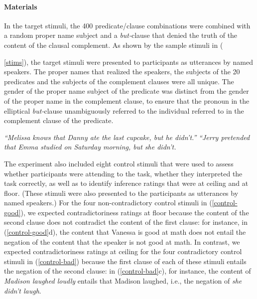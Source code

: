 \documentclass[11pt,fleqn]{article}
\newcommand{\6}{\mbox{$[\hspace*{-.6mm}[$}}
\newcommand{\9}{\mbox{$]\hspace*{-.6mm}]$}}
\begin{document}
\paragraph{Materials} In the target stimuli, the 400 predicate/clause combinations were combined with a random proper name subject and a {\em but-}clause that denied the truth of the content of the clausal complement. As shown by the sample stimuli in ({\ref{stims}), the target stimuli were presented to participants as utterances by named speakers. The proper names that realized the speakers, the subjects of the 20 predicates and the subjects of the complement clauses were all unique. The gender of the proper name subject of the predicate was distinct from the gender of the proper name in the complement clause, to ensure that the pronoun in the elliptical {\em but-}clause unambiguously referred to the individual referred to in the complement clause of the predicate.

\begin{exe}
\ex\label{stims}
\begin{xlist}
 {\em ``Melissa knows that Danny ate the last cupcake, but he didn't.''}
 {\em ``Jerry pretended that Emma studied on Saturday morning, but she didn't.}
\end{xlist}
\end{exe}

The experiment also included eight control stimuli that were used to assess whether participants were attending to the task, whether they interpreted the task correctly, as well as to identify inference ratings that were at ceiling and at floor. (These stimuli were also presented to the participants as utterances by named speakers.) For the four non-contradictory control stimuli in (\ref{control-good}), we expected contradictoriness ratings at floor because the content of the second clause does not contradict the content of the first clause: for instance, in (\ref{control-good}d), the content that Vanessa is good at math does not entail the negation of the content that the speaker is not good at math. In contrast, we expected contradictoriness ratings at ceiling for the four contradictory control stimuli in (\ref{control-bad}) because the first clause of each of these stimuli entails the negation of the second clause: in (\ref{control-bad}c), for instance, the content of {\em Madison laughed loudly} entails that Madison laughed, i.e., the negation of {\em she didn't laugh}.

}
\end{document}
